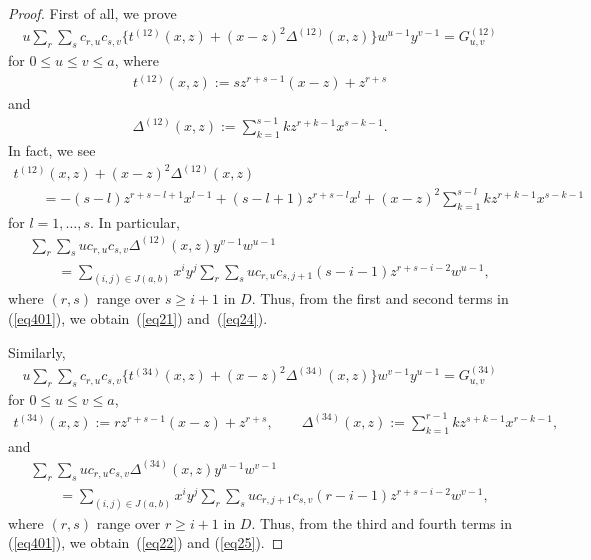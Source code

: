 \documentclass[pdftex]{sigma}
\numberwithin{equation}{section}
\theoremstyle{definition}
\begin{document}
\begin{proof} First of all, we prove
\begin{gather*}u\sum_r\sum_s c_{r,u}c_{s,v}\big\{t^{(12)}(x,z)+(x-z)^2\Delta^{(12)}(x,z)\big\}w^{u-1}y^{v-1}=G^{(12)}_{u,v}\end{gather*}
for $0\leq u\leq v\leq a$, where
\begin{gather*} t^{(12)}(x,z):=sz^{r+s-1}(x-z)+z^{r+s}\end{gather*}
and
\begin{gather*}\Delta^{(12)}(x,z):=\sum_{k=1}^{s-1}kz^{r+k-1}x^{s-k-1}.\end{gather*}
In fact, we see
\begin{gather*}t^{(12)}(x,z)+(x-z)^2\Delta^{(12)}(x,z)\\
\qquad{} =-(s-l)z^{r+s-l+1}x^{l-1}+(s-l+1)z^{r+s-l}x^l+(x-z)^2\sum_{k=1}^{s-l}kz^{r+k-1}x^{s-k-1}\end{gather*}
for $l=1,\dots,s$. In particular,
\begin{gather*}\sum_r\sum_s uc_{r,u}c_{s,v}\Delta^{(12)}(x,z)y^{v-1}w^{u-1}\\
\qquad{} =\sum_{(i,j)\in J(a,b)}x^iy^j\sum_r\sum_s uc_{r,u}c_{s,j+1}(s-i-1)z^{r+s-i-2}w^{u-1},\end{gather*}
where $(r,s)$ range over $s\geq i+1$ in $D$. Thus, from the f\/irst and second terms in (\ref{eq401}), we obtain~(\ref{eq21}) and~(\ref{eq24}).

Similarly,
\begin{gather*}u\sum_r\sum_s c_{r,u}c_{s,v}\big\{t^{(34)}(x,z)+(x-z)^2\Delta^{(34)}(x,z)\big\}w^{v-1}y^{u-1}=G^{(34)}_{u,v}\end{gather*}
for $0\leq u\leq v\leq a$,
\begin{gather*} t^{(34)}(x,z):=rz^{r+s-1}(x-z)+z^{r+s}, \qquad %
\Delta^{(34)}(x,z):=\sum_{k=1}^{r-1}kz^{s+k-1}x^{r-k-1},\end{gather*}
and
\begin{gather*}\sum_r\sum_s uc_{r,u}c_{s,v}\Delta^{(34)}(x,z)y^{u-1}w^{v-1}\\
\qquad{} =\sum_{(i,j)\in J(a,b)}x^iy^j\sum_r\sum_s uc_{r,j+1}c_{s,v}(r-i-1)z^{r+s-i-2}w^{v-1},\end{gather*}
where $(r,s)$ range over $r\geq i+1$ in $D$. Thus, from the third and fourth terms in (\ref{eq401}), we obtain~(\ref{eq22}) and (\ref{eq25}).


\end{proof}
\end{document}
